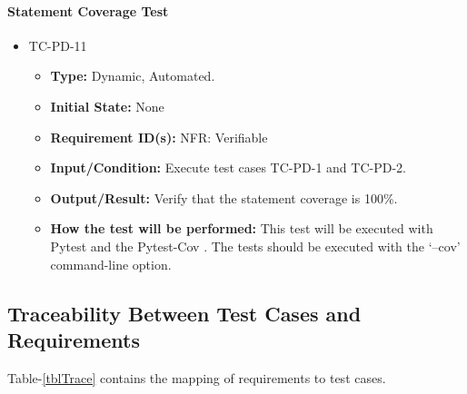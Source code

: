 \documentclass[12pt, titlepage]{article}
\begin{document}
\paragraph{Statement Coverage Test}

\begin{itemize}
\item{TC-PD-11\\}
\begin{itemize}

\item{\textbf{Type:}} Dynamic, Automated.
					
\item{\textbf{Initial State:}} None

\item{\textbf{Requirement ID(s):}} NFR: Verifiable
					
\item{\textbf{Input/Condition:}}  Execute test cases TC-PD-1 and TC-PD-2.
					
\item{\textbf{Output/Result:}} Verify that the statement coverage is 100\%.

\item{\textbf{How the test will be performed:}}  This test will be executed with Pytest \cite{Pytest} and 
the Pytest-Cov \cite{PyTest-Cov}. The tests should be executed with the `--cov' command-line option.

\end{itemize}
\end{itemize}

\subsection{Traceability Between Test Cases and Requirements}


Table-\ref{tblTrace} contains the mapping of requirements to test cases.
  
\end{document}

